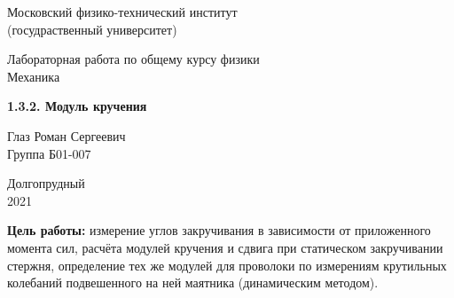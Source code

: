\documentclass[a4paper, 12pt]{article} %
\begin{document}


\begin{titlepage}

    \newpage
    \begin{center}
        \normalsize Московский физико-технический институт \\(госудраственный университет)
    \end{center}

    \vspace{6em}

    \begin{center}
        \Large Лабораторная работа по общему курсу физики\\Механика
    \end{center}

    \vspace{1em}

    \begin{center}
        \Large \textbf{1.3.2. Модуль кручения}
    \end{center}

    \vspace{2em}

    \begin{center}
        \large Глаз Роман Сергеевич \\
        Группа Б01-007
    \end{center}

    \vspace{\fill}

    \begin{center}
        Долгопрудный \\2021
    \end{center}
    
\end{titlepage}



    \thispagestyle{empty}
    \newpage
    \tableofcontents
    \newpage
    \setcounter{page}{1}

\textbf{Цель работы:} измерение углов закручивания в зависимости от приложенного момента сил, расчёта модулей кручения и сдвига при статическом закручивании стержня, определение тех же модулей для проволоки по измерениям крутильных колебаний подвешенного на ней маятника (динамическим методом).\\
\end{document}

